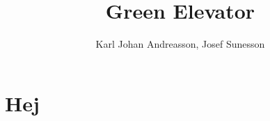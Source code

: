 \documentclass[10pt,a4paper]{article}
\author{Karl Johan Andreasson, Josef Sunesson}
\title{Green Elevator}
\begin{document}
\maketitle
\section{Hej}
\end{document}
